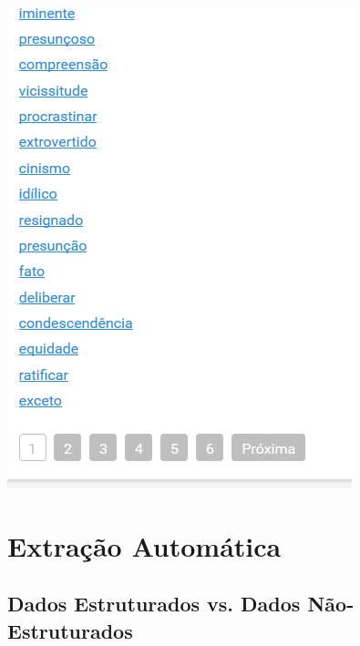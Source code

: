 \documentclass{beamer}
\begin{document}
\begin{frame}
\includegraphics[width=\textwidth]{Dicio2_com_br.png}
\end{frame}



\section{Extração Automática}

\subsection{Dados Estruturados vs. Dados Não-Estruturados} 
\end{document}
